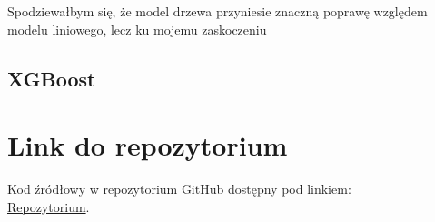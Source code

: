 \documentclass[11pt]{article}
\begin{document}
Spodziewałbym się, że model drzewa przyniesie znaczną poprawę względem modelu liniowego, lecz ku mojemu zaskoczeniu

\subsection{XGBoost}


\section{Link do repozytorium}\label{sec:link-do-repo}
Kod źródłowy w repozytorium GitHub dostępny pod linkiem: \\
\href{https://github.com/KotZPolibudy/PUT_SUS/zdataset-analiza}{Repozytorium}.
\end{document}

